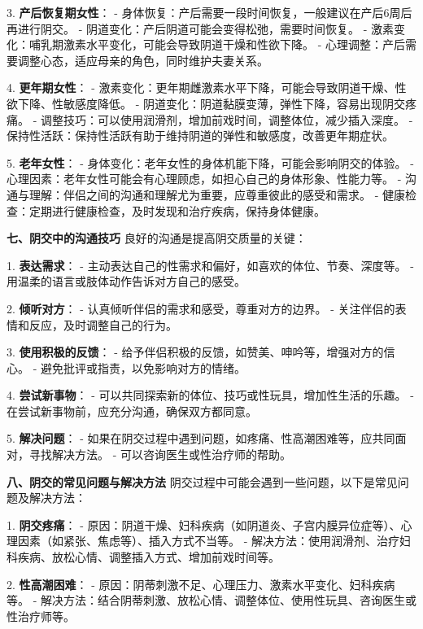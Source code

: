 \begin{enumerate}
  3. \textbf{产后恢复期女性}：
     - 身体恢复：产后需要一段时间恢复，一般建议在产后6周后再进行阴交。
     - 阴道变化：产后阴道可能会变得松弛，需要时间恢复。
     - 激素变化：哺乳期激素水平变化，可能会导致阴道干燥和性欲下降。
     - 心理调整：产后需要调整心态，适应母亲的角色，同时维护夫妻关系。

  4. \textbf{更年期女性}：
     - 激素变化：更年期雌激素水平下降，可能会导致阴道干燥、性欲下降、性敏感度降低。
     - 阴道变化：阴道黏膜变薄，弹性下降，容易出现阴交疼痛。
     - 调整技巧：可以使用润滑剂，增加前戏时间，调整体位，减少插入深度。
     - 保持性活跃：保持性活跃有助于维持阴道的弹性和敏感度，改善更年期症状。

  5. \textbf{老年女性}：
     - 身体变化：老年女性的身体机能下降，可能会影响阴交的体验。
     - 心理因素：老年女性可能会有心理顾虑，如担心自己的身体形象、性能力等。
     - 沟通与理解：伴侣之间的沟通和理解尤为重要，应尊重彼此的感受和需求。
     - 健康检查：定期进行健康检查，及时发现和治疗疾病，保持身体健康。

  \textbf{七、阴交中的沟通技巧}
  良好的沟通是提高阴交质量的关键：

  1. \textbf{表达需求}：
     - 主动表达自己的性需求和偏好，如喜欢的体位、节奏、深度等。
     - 用温柔的语言或肢体动作告诉对方自己的感受。

  2. \textbf{倾听对方}：
     - 认真倾听伴侣的需求和感受，尊重对方的边界。
     - 关注伴侣的表情和反应，及时调整自己的行为。

  3. \textbf{使用积极的反馈}：
     - 给予伴侣积极的反馈，如赞美、呻吟等，增强对方的信心。
     - 避免批评或指责，以免影响对方的情绪。

  4. \textbf{尝试新事物}：
     - 可以共同探索新的体位、技巧或性玩具，增加性生活的乐趣。
     - 在尝试新事物前，应充分沟通，确保双方都同意。

  5. \textbf{解决问题}：
     - 如果在阴交过程中遇到问题，如疼痛、性高潮困难等，应共同面对，寻找解决方法。
     - 可以咨询医生或性治疗师的帮助。

  \textbf{八、阴交的常见问题与解决方法}
  阴交过程中可能会遇到一些问题，以下是常见问题及解决方法：

  1. \textbf{阴交疼痛}：
     - 原因：阴道干燥、妇科疾病（如阴道炎、子宫内膜异位症等）、心理因素（如紧张、焦虑等）、插入方式不当等。
     - 解决方法：使用润滑剂、治疗妇科疾病、放松心情、调整插入方式、增加前戏时间等。

  2. \textbf{性高潮困难}：
     - 原因：阴蒂刺激不足、心理压力、激素水平变化、妇科疾病等。
     - 解决方法：结合阴蒂刺激、放松心情、调整体位、使用性玩具、咨询医生或性治疗师等。


\end{enumerate}
